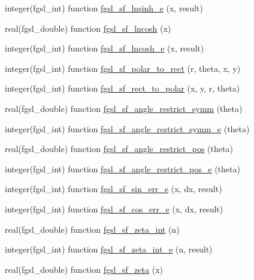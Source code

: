 \begin{DoxyCompactItemize}
\item 
integer(fgsl\-\_\-int) function \hyperlink{specfunc_8finc_a60a53c313477b372d770fbd1d649745b}{fgsl\-\_\-sf\-\_\-lnsinh\-\_\-e} (x, result)
\item 
real(fgsl\-\_\-double) function \hyperlink{specfunc_8finc_a119b7fc003b918daff467e93f5dfabf4}{fgsl\-\_\-sf\-\_\-lncosh} (x)
\item 
integer(fgsl\-\_\-int) function \hyperlink{specfunc_8finc_a468056cedb614e0479f0b72f7bd5d564}{fgsl\-\_\-sf\-\_\-lncosh\-\_\-e} (x, result)
\item 
integer(fgsl\-\_\-int) function \hyperlink{specfunc_8finc_a158890c3630914d2603572633ac07da1}{fgsl\-\_\-sf\-\_\-polar\-\_\-to\-\_\-rect} (r, theta, x, y)
\item 
integer(fgsl\-\_\-int) function \hyperlink{specfunc_8finc_a213288b2759873ac9d8f04e1bca141ab}{fgsl\-\_\-sf\-\_\-rect\-\_\-to\-\_\-polar} (x, y, r, theta)
\item 
real(fgsl\-\_\-double) function \hyperlink{specfunc_8finc_aa7d60325b186984c8cd117203d2ac494}{fgsl\-\_\-sf\-\_\-angle\-\_\-restrict\-\_\-symm} (theta)
\item 
integer(fgsl\-\_\-int) function \hyperlink{specfunc_8finc_a8d0429655dd67743a735e27d1f8ad077}{fgsl\-\_\-sf\-\_\-angle\-\_\-restrict\-\_\-symm\-\_\-e} (theta)
\item 
real(fgsl\-\_\-double) function \hyperlink{specfunc_8finc_a83fc3ecbb2016e0bfb9ffbef3458f793}{fgsl\-\_\-sf\-\_\-angle\-\_\-restrict\-\_\-pos} (theta)
\item 
integer(fgsl\-\_\-int) function \hyperlink{specfunc_8finc_a79e9eb81ed49440d7af94e13bbb97253}{fgsl\-\_\-sf\-\_\-angle\-\_\-restrict\-\_\-pos\-\_\-e} (theta)
\item 
integer(fgsl\-\_\-int) function \hyperlink{specfunc_8finc_ac9c94e408974c1a29afbdeba275e206e}{fgsl\-\_\-sf\-\_\-sin\-\_\-err\-\_\-e} (x, dx, result)
\item 
integer(fgsl\-\_\-int) function \hyperlink{specfunc_8finc_a3692646ebbef1e7eb581ec851029d615}{fgsl\-\_\-sf\-\_\-cos\-\_\-err\-\_\-e} (x, dx, result)
\item 
real(fgsl\-\_\-double) function \hyperlink{specfunc_8finc_af9c46c23455b430937b3d21e3e8c5678}{fgsl\-\_\-sf\-\_\-zeta\-\_\-int} (n)
\item 
integer(fgsl\-\_\-int) function \hyperlink{specfunc_8finc_a922363ceb589f2ed5186461873b8f63c}{fgsl\-\_\-sf\-\_\-zeta\-\_\-int\-\_\-e} (n, result)
\item 
real(fgsl\-\_\-double) function \hyperlink{specfunc_8finc_a75dbcf8f19fa5845ba4a0c15fd6bff2c}{fgsl\-\_\-sf\-\_\-zeta} (x)

\end{DoxyCompactItemize}
